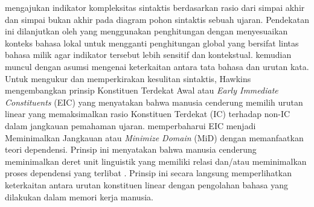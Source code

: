 \cite{miller1963finitary} mengajukan indikator kompleksitas sintaktis berdasarkan rasio dari simpai akhir dan simpai bukan akhir pada diagram pohon sintaktis sebuah ujaran. Pendekatan ini dilanjutkan oleh \cite{frazier1985syntactic} yang menggunakan penghitungan dengan menyesuaikan konteks bahasa lokal untuk mengganti penghitungan global yang bersifat lintas bahasa milik \cite{miller1963finitary} agar indikator tersebut lebih sensitif dan kontekstual. \cite{hawkins1994performance} kemudian muncul dengan asumsi mengenai keterkaitan antara tata bahasa dan urutan kata. Untuk mengukur dan memperkirakan kesulitan sintaktis, Hawkins mengembangkan prinsip Konstituen Terdekat Awal atau \textit{Early Immediate Constituents} (EIC) yang menyatakan bahwa manusia cenderung memilih urutan linear yang memaksimalkan rasio Konstituen Terdekat (IC) terhadap non-IC dalam jangkauan pemahaman ujaran. \cite{hawkins2004efficiency} memperbaharui EIC menjadi Meminimalkan Jangkauan atau \textit{Minimize Domain} (MiD) dengan memanfaatkan teori dependensi. Prinsip ini menyatakan bahwa manusia cenderung meminimalkan deret unit linguistik yang memiliki relasi dan/atau meminimalkan proses dependensi yang terlibat \citep{hawkins2004efficiency}. Prinsip ini secara langsung memperlihatkan keterkaitan antara urutan konstituen linear dengan pengolahan bahasa yang dilakukan dalam memori kerja manusia.


